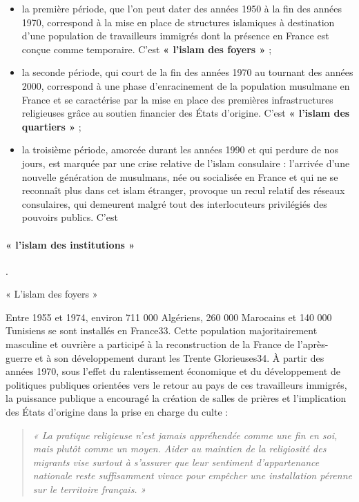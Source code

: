 \begin{itemize}
\item
  la première période, que l'on peut dater des années 1950 à la fin des
  années 1970, correspond à la mise en place de structures islamiques à
  destination d'une population de travailleurs immigrés dont la présence
  en France est conçue comme temporaire. C'est \textbf{« l'islam des
  foyers »} ;
\item
  la seconde période, qui court de la fin des années 1970 au tournant
  des années 2000, correspond à une phase d'enracinement de la
  population musulmane en France et se caractérise par la mise en place
  des premières infrastructures religieuses grâce au soutien financier
  des États d'origine. C'est \textbf{« l'islam des quartiers »} ;
\item
  la troisième période, amorcée durant les années 1990 et qui perdure de
  nos jours, est marquée par une crise relative de l'islam consulaire :
  l'arrivée d'une nouvelle génération de musulmans, née ou socialisée en
  France et qui ne se reconnaît plus dans cet islam étranger, provoque
  un recul relatif des réseaux consulaires, qui demeurent malgré tout
  des interlocuteurs privilégiés des pouvoirs publics. C'est
\end{itemize}


\paragraph{« l'islam des institutions »}.


« L'islam des foyers »


Entre 1955 et 1974, environ 711 000 Algériens, 260 000 Marocains et 140
000 Tunisiens se sont installés en France33. Cette population
majoritairement masculine et ouvrière a participé à la reconstruction de
la France de l'après-guerre et à son développement durant les Trente
Glorieuses34. À partir des années 1970, sous l'effet du ralentissement
économique et du développement de politiques publiques orientées vers le
retour au pays de ces travailleurs immigrés, la puissance publique a
encouragé la création de salles de prières et l'implication des États
d'origine dans la prise en charge du culte : 
\begin{quote}
    \emph{« La pratique
religieuse n'est jamais appréhendée comme une fin en soi, mais plutôt
comme un moyen. Aider au maintien de la religiosité des migrants vise
surtout à s'assurer que leur sentiment d'appartenance nationale reste
suffisamment vivace pour empêcher une installation pérenne sur le
territoire français.} 
\emph{»} 
\end{quote}

